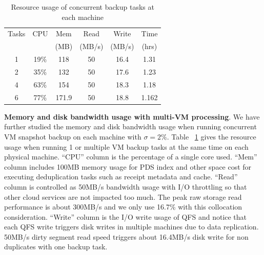 \begin{table}
  \centering
    \begin{tabular}{|c|c|c|c|c|c|}
    \hline
    Tasks & CPU & Mem &Read &  Write  & Time  \\ 
    & & (MB)          &(MB/s) &  (MB/s) & (hrs) \\ \hline
    1     & 19\% & 118 & 50 & 16.4 & 1.31\\ \hline
    2     & 35\% & 132 &50  & 17.6 & 1.23\\ \hline
    4     & 63\% & 154&50   & 18.3 & 1.18\\ \hline
    6     & 77\% & 171.9 & 50 &  18.8 & 1.162\\ \hline
    \end{tabular}
\caption{Resource usage of concurrent backup tasks at each machine}
\label{tab:resource_usage}
\end{table}

{\bf Memory and disk bandwidth usage with multi-VM processing}. 
We have further studied the memory and disk bandwidth usage 
when running concurrent VM snapshot backup on each machine with $\sigma=2\%$. 
Table ~\ref{tab:resource_usage} gives the resource usage  when
running 1 or multiple  VM backup tasks at the same time on each physical machine. 
``CPU'' column is the percentage of a single core used. 
``Mem'' column includes 100MB memory usage for PDS index and other space cost for executing deduplication tasks such as 
receipt metadata and cache. 
``Read'' column is controlled as 50MB/s bandwidth usage with I/O throttling so that other cloud services are not impacted too much.
The peak raw storage read performance is about 300MB/s and we only use 16.7\% with this collocation consideration.
``Write'' column is the I/O write usage of QFS and notice that each QFS write triggers disk writes in multiple machines due to
data replication.     50MB/s dirty segment read speed triggers about 16.4MB/s disk write for non duplicates with one backup task.

